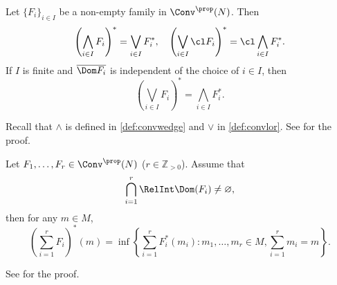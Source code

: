 \begin{proposition}\label{prop:Legendretranssup}
    Let $\{F_i\}_{i\in I}$ be a non-empty family in $\Conv^{\prop}(N)$. Then
    \[
    \left(\bigwedge_{i\in I} F_i\right)^*=\bigvee_{i\in I} F_i^*,\quad \left(\bigvee_{i\in I} \cl F_i\right)^*=\cl \bigwedge_{i\in I} F_i^*.
    \]
    If $I$ is finite and $\overline{\Dom F_i}$ is independent of the choice of $i\in I$, then
    \[
    \left(\bigvee_{i\in I} F_i\right)^*=\bigwedge_{i\in I} F_i^*.
    \]
\end{proposition}
Recall that $\wedge$ is defined in \cref{def:convwedge} and $\lor$ in \cref{def:convlor}. See \cite[Theorem~16.5]{Roc70} for the proof.

\begin{proposition}\label{prop:sumLegendre}
    Let $F_1,\ldots,F_r\in \Conv^{\prop}(N)$ ($r\in \mathbb{Z}_{>0}$). Assume that
    \[
        \bigcap_{i=1}^r\RelInt \Dom(F_i)\neq \varnothing,
    \]
    then for any $m\in M$,
    \[
    \left( \sum_{i=1}^r F_i \right)^*(m)=\inf\left\{\sum_{i=1}^r F_i^*(m_i):m_1,\ldots,m_r\in M, \sum_{i=1}^r m_i=m  \right\}.
    \]
\end{proposition}
See \cite[Theorem~16.4]{Roc70} for the proof.

